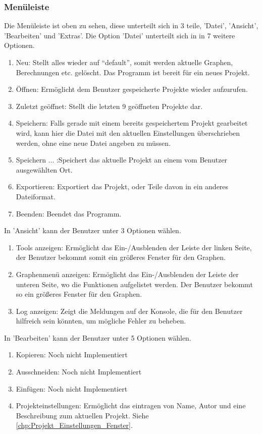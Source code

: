 \documentclass{scrartcl}
\begin{document}
\subsubsection{Men\"uleiste}
Die Men\"uleiste ist oben zu sehen, diese unterteilt sich in 3 teile, 'Datei', 'Ansicht', 'Bearbeiten' und 'Extras'.
Die Option 'Datei' unterteilt sich in in 7 weitere Optionen.
\begin{enumerate}
 \item Neu: Stellt alles wieder auf ``default'', somit werden aktuelle Graphen, Berechnungen etc. gel\"oscht. Das Programm ist bereit f\"ur ein neues Projekt.
 \item \"Offnen: Erm\"oglicht dem Benutzer gespeicherte Projekte wieder aufzurufen.
 \item Zuletzt ge\"offnet: Stellt die letzten 9 ge\"offneten Projekte dar.
 \item Speichern: Falls gerade mit einem bereits gespeichertem Projekt gearbeitet wird, kann hier die Datei mit den aktuellen Einstellungen \"uberschrieben werden, ohne eine neue Datei angeben zu m\"ussen.
 \item Speichern ... :Speichert das aktuelle Projekt an einem vom Benutzer ausgew\"ahlten Ort.
 \item Exportieren: Exportiert das Projekt, oder Teile davon in ein anderes Dateiformat.
 \item Beenden: Beendet das Programm.
\newpage
\end{enumerate}
In 'Ansicht' kann der Benutzer unter 3 Optionen w\"ahlen.
\begin{enumerate}
 \item Tools anzeigen: Erm\"oglicht das Ein-/Ausblenden der Leiste der linken Seite, der Benutzer bekommt somit ein gr\"o\ss{}eres Fenster f\"ur den Graphen.
 \item Graphenmen\"u anzeigen: Erm\"oglicht das Ein-/Ausblenden der Leiste der unteren Seite, wo die Funktionen aufgelistet werden. Der Benutzer bekommt so ein gr\"o\ss{}eres Fenster f\"ur den Graphen.
 \item Log anzeigen: Zeigt die Meldungen auf der Konsole, die f\"ur den Benutzer hilfreich sein k\"onnten, um m\"ogliche Fehler zu beheben.
\end{enumerate}
In 'Bearbeiten' kann der Benutzer unter 5 Optionen w\"ahlen.
\begin{enumerate}
 \item Kopieren: Noch nicht Implementiert
 \item Ausschneiden: Noch nicht Implementiert
 \item Einf\"ugen: Noch nicht Implementiert
 \item Projekteinstellungen: Erm\"oglicht das eintragen von Name, Autor und eine Beschreibung zum aktuellen Projekt. Siehe  \ref{chp:Projekt_Einstellungen_Fenster}.
\end{enumerate}
\end{document}

